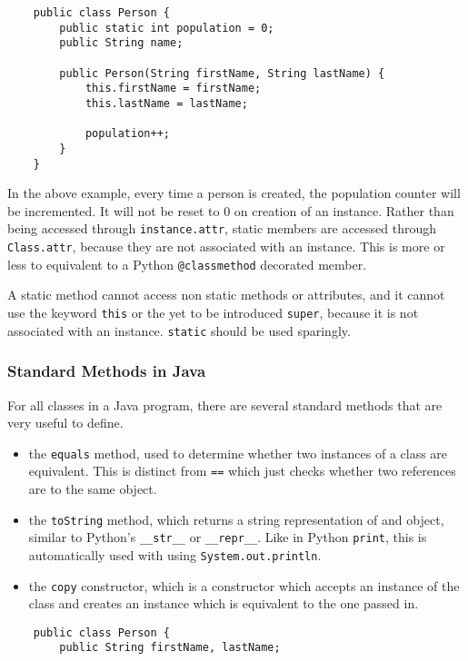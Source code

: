 \documentclass[12pt]{report}
\newcommand{\code}[1]{\lstinline{#1}}
\begin{document}
\begin{flushleft}
\begin{lstlisting}
    public class Person {
        public static int population = 0;
        public String name;

        public Person(String firstName, String lastName) {
            this.firstName = firstName;
            this.lastName = lastName;

            population++;
        }
    }
\end{lstlisting}

In the above example, every time a person is created, the population counter
will be incremented. It will not be reset to \(0\) on creation of an instance.
Rather than being accessed through \code{instance.attr}, static members are 
accessed through \code{Class.attr}, because they are not associated with an
instance. This is more or less to equivalent to a Python \code{@classmethod}
decorated member. \par
A static method cannot access non static methods or attributes, and it
cannot use the keyword \code{this} or the yet to be introduced \code{super}, 
because it is not associated with an instance. \code{static} should be used
sparingly.

\subsubsection*{Standard Methods in Java}
For all classes in a Java program, there are several standard methods that are
very useful to define.

\begin{itemize}
    \item the \code{equals} method, used to determine whether two instances of
        a class are equivalent. This is distinct from \code{==} which just 
        checks whether two references are to the same object.
    \item the \code{toString} method, which returns a string representation of
        and object, similar to Python's \code{__str__} or \code{__repr__}. Like
        in Python \code{print}, this is automatically used with using 
        \code{System.out.println}.
    \item the \code{copy} constructor, which is a constructor which accepts an
        instance of the class and creates an instance which is equivalent to
        the one passed in.
\end{itemize}

\begin{lstlisting}
    public class Person {
        public String firstName, lastName;


\end{lstlisting}
\end{flushleft}
\end{document}
